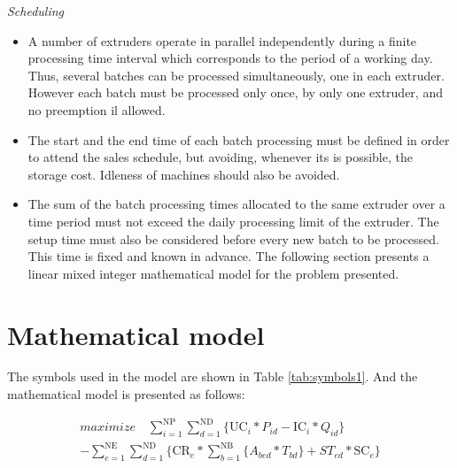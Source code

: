\emph{Scheduling}

\begin{itemize}
\item A number of extruders operate in parallel independently during a finite processing time interval which corresponds to the period of a working day. Thus, several batches can be processed simultaneously, one in each extruder. However each batch must be processed only once, by only one extruder, and no preemption il allowed. 
\item The start and the end time of each batch processing must be defined in order to attend the sales schedule, but avoiding, whenever its is possible, the storage cost. Idleness of machines should also be avoided.
\item The sum of the batch processing times allocated to the same extruder over a time period must not exceed the daily processing limit of the extruder. The setup time must also be considered before every new batch to be processed. This time is fixed and known in advance. The following section presents a linear mixed integer mathematical model for the problem presented.
\end{itemize}

\section{Mathematical model}

The symbols used in the model are shown in Table \ref{tab:symbols1}. And the mathematical model is
presented as follows:

\begin{eqnarray} 
\label{eq:objFunc}
	 maximize \quad \nonumber
	 \sum_{i=1}^{\mathrm{NP}}{\sum_{d=1}^{\mathrm{ND}}\{\mathrm{UC}_i*P_{id} - \mathrm{IC}_i*Q_{id}}\}  \\ 
	 - {\sum_{e=1}^{\mathrm{NE}}\sum_{d=1}^{\mathrm{ND}}\{\mathrm{CR}_e*\sum_{b=1}^{\mathrm{NB}}\{A_{bed}*T_{bd}\} + ST_{ed}*\mathrm{SC}_e}\}
\end{eqnarray}

